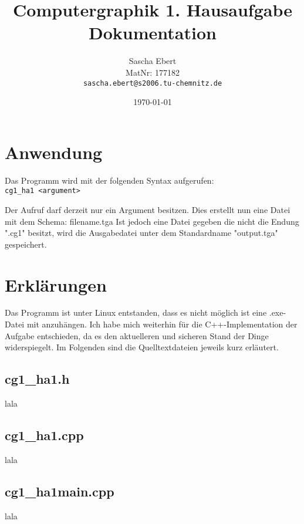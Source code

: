 \documentclass{article}
\title{Computergraphik 1. Hausaufgabe\\Dokumentation}
\author
{
	Sascha Ebert\\
	MatNr: 177182\\
	\texttt{sascha.ebert@s2006.tu-chemnitz.de}
}
\date{\today}
\begin{document}
\maketitle

\section{Anwendung}
Das Programm wird mit der folgenden Syntax aufgerufen:\\
\texttt{cg1\_ha1 <argument>}

Der Aufruf darf derzeit nur ein Argument besitzen.
Dies erstellt nun eine Datei mit dem Schema: filename.tga
Ist jedoch eine Datei gegeben die nicht die Endung ".cg1" besitzt,
wird die Ausgabedatei unter dem Standardname "output.tga" gespeichert.


\section{Erkl\"arungen}

Das Programm ist unter Linux entstanden, dass es nicht m\"oglich ist eine .exe-Datei
mit anzuh\"angen.
Ich habe mich weiterhin f\"ur die C++-Implementation der Aufgabe entschieden, da es den aktuelleren
und sicheren Stand der Dinge widerspiegelt.
Im Folgenden sind die Quelltextdateien jeweils kurz erläutert.

\subsection{cg1\_ha1.h}
lala
\subsection{cg1\_ha1.cpp}
lala
\subsection{cg1\_ha1\textunderscore main.cpp}
lala
\end{document}
